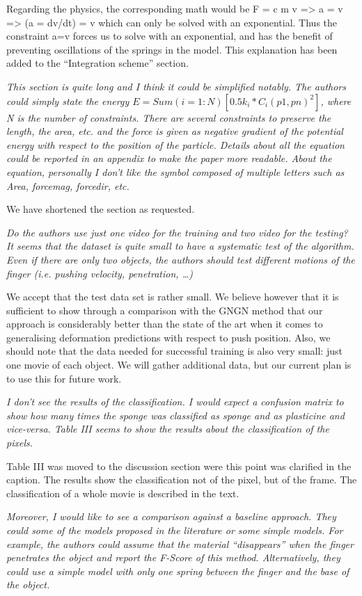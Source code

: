 \documentclass[letterpaper,12pt]{letter}
\begin{document}
Regarding the physics, the corresponding math would be F = c m v  =>  a = v  =>  (a = dv/dt) = v which can only be solved with an exponential. Thus the constraint a=v forces us to solve with an exponential, and has the benefit of preventing oscillations of the springs in the model.  This explanation has been added to the “Integration scheme” section. 

\emph{This section is quite long and I think it could be simplified notably. The authors could simply state the energy $E = Sum(i=1:N) [ 0.5 k_i * C_i(p1, pn)^2]$, where N is the number of constraints. There are several constraints to preserve the length, the area, etc. and the force is given as negative gradient of the potential energy with respect to the position of the particle. Details about all the equation could be reported in an appendix to make the paper more readable. About the equation, personally I don’t like the symbol composed of multiple letters such as Area, forcemag, forcedir, etc.}

We have shortened the section as requested.

\emph{Do the authors use just one video for the training and two video for the testing? It seems that the dataset is quite small to have a systematic test of the algorithm. Even if there are only two objects, the authors should test different motions of the finger (i.e. pushing velocity, penetration, …)}

We accept that the test data set is rather small. We believe however that it is sufficient to show through a comparison with the GNGN method that our approach is considerably better than the state of the art when it comes to generalising deformation predictions with respect to push position. Also, we should note that the data needed for successful training is also very small: just one movie of each object. We will gather additional data, but our current plan is to use this for future work. 

\emph{I don’t see the results of the classification. I would expect a confusion matrix to show how many times the sponge was classified as sponge and as plasticine and vice-versa. Table III seems to show the results about the classification of the pixels.}

Table III was moved to the discussion section were this point was clarified in the caption. The results show the classification not of the pixel, but of the frame. The classification of a whole movie is described in the text.

\emph{Moreover, I would like to see a comparison against a baseline approach. They could some of the models proposed in the literature or some simple models. For example, the authors could assume that the material “disappears” when the finger penetrates the object and report the F-Score of this method. Alternatively, they could use a simple model with only one spring between the finger and the base of the object.}
\end{document}
